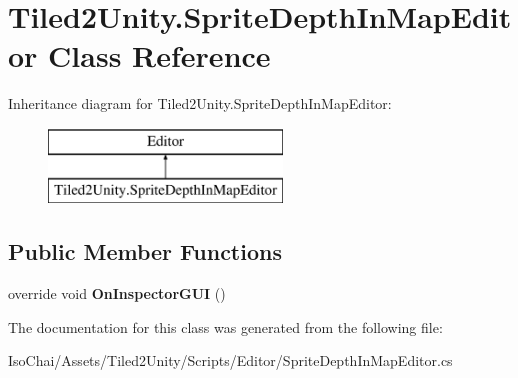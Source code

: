 \hypertarget{class_tiled2_unity_1_1_sprite_depth_in_map_editor}{}\section{Tiled2\+Unity.\+Sprite\+Depth\+In\+Map\+Editor Class Reference}
\label{class_tiled2_unity_1_1_sprite_depth_in_map_editor}
Inheritance diagram for Tiled2\+Unity.\+Sprite\+Depth\+In\+Map\+Editor\+:\begin{figure}[H]
\begin{center}
\leavevmode
\includegraphics[height=2.000000cm]{class_tiled2_unity_1_1_sprite_depth_in_map_editor}
\end{center}
\end{figure}
\subsection*{Public Member Functions}
\begin{DoxyCompactItemize}
\item 
\mbox{\label{class_tiled2_unity_1_1_sprite_depth_in_map_editor_aa56bfe7c8ed00dbe8ce3e20f52cd17c6}} 
override void {\bfseries On\+Inspector\+G\+UI} ()
\end{DoxyCompactItemize}


The documentation for this class was generated from the following file\+:\begin{DoxyCompactItemize}
\item 
Iso\+Chai/\+Assets/\+Tiled2\+Unity/\+Scripts/\+Editor/Sprite\+Depth\+In\+Map\+Editor.\+cs\end{DoxyCompactItemize}
